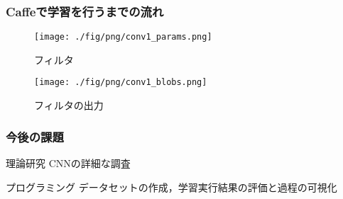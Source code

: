 \documentclass[dvipdfmx,11pt,notheorems]{beamer}
\theoremstyle{definition}
\begin{document}





\begin{frame}\frametitle{Caffeで学習を行うまでの流れ}
\begin{figure}[t]
 \begin{minipage}{0.4\hsize}
  \centering
  \texttt{[image: ./fig/png/conv1\_params.png]}
  \caption{フィルタ}
 \end{minipage}
 \begin{minipage}{0.4\hsize}
  \centering
  \texttt{[image: ./fig/png/conv1\_blobs.png]}
  \caption{フィルタの出力}
 \end{minipage}
\end{figure}
\end{frame}




\begin{frame}\frametitle{今後の課題}

\begin{block}{理論研究}
CNNの詳細な調査
\end{block}

\vspace{1cm}
\begin{exampleblock}{プログラミング}
データセットの作成，学習実行結果の評価と過程の可視化
\end{exampleblock}
\end{frame}
\end{document}
